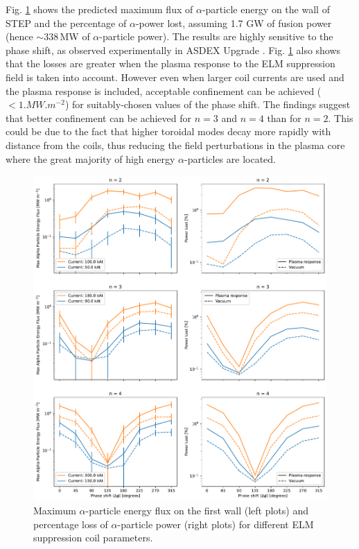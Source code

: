 \documentclass[10pt, a4paper, twoside]{article}
\begin{document}
Fig. \ref{fig:max_and_total_flux_vs_phase} shows the predicted maximum flux of $\alpha$-particle energy on the wall of STEP and the percentage of $\alpha$-power lost, assuming 1.7 GW of fusion power (hence $\sim 338\,$MW of $\alpha$-particle power). The results are highly sensitive to the phase shift, as observed experimentally in ASDEX Upgrade \cite{sanchis2018}. Fig. \ref{fig:max_and_total_flux_vs_phase} also shows that the losses are greater when the plasma response to the ELM suppression field is taken into account. However even when larger coil currents are used and the plasma response is included, acceptable confinement can be achieved ($<1\si{.MW.m^{-2}}$) for suitably-chosen values of the phase shift. The findings suggest that better confinement can be achieved for $n=3$ and $n=4$ than for $n=2$. This could be due to the fact that higher toroidal modes decay more rapidly with distance from the coils, thus reducing the field perturbations in the plasma core where the great majority of high energy $\alpha$-particles are located.

\begin{figure}[!htb]
    \centering
    \includegraphics[width=0.99\linewidth]{Figures/max_and_total_flux_vs_phase.pdf}
    \caption{Maximum $\alpha$-particle energy flux on the first wall (left plots) and percentage loss of $\alpha$-particle power (right plots) for different ELM suppression coil parameters.}
    \label{fig:max_and_total_flux_vs_phase}
\end{figure}
\end{document}
